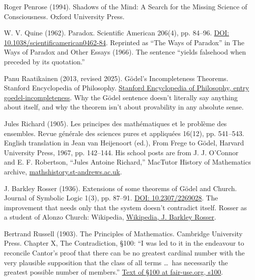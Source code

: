 \documentclass[11pt,twoside]{article}
\theoremstyle{thielethm}
\theoremstyle{thieledef}
\theoremstyle{thieledef}
\theoremstyle{thieledef}
\theoremstyle{thielethm}
\theoremstyle{thieleobs}
\theoremstyle{thielethm}
\begin{document}
\noindent Roger Penrose (1994). Shadows of the Mind: A Search for the Missing Science of Consciousness. Oxford University Press.
\par\medskip

\noindent W. V. Quine (1962). Paradox. Scientific American 206(4), pp. 84--96. \href{https://doi.org/10.1038/scientificamerican0462-84}{DOI: 10.1038/scientificamerican0462-84}. Reprinted as ``The Ways of Paradox'' in The Ways of Paradox and Other Essays (1966). The sentence ``yields falsehood when preceded by its quotation.''
\par\medskip

\noindent Panu Raatikainen (2013, revised 2025). G\"odel's Incompleteness Theorems. Stanford Encyclopedia of Philosophy. \href{https://plato.stanford.edu/entries/goedel-incompleteness/}{Stanford Encyclopedia of Philosophy, entry goedel-incompleteness}. Why the G\"odel sentence doesn't literally say anything about itself, and why the theorem isn't about provability in any absolute sense.
\par\medskip

\noindent Jules Richard (1905). Les principes des math\'ematiques et le probl\`eme des ensembles. Revue g\'en\'erale des sciences pures et appliqu\'ees 16(12), pp. 541--543. English translation in Jean van Heijenoort (ed.), From Frege to G\"odel, Harvard University Press, 1967, pp. 142--144. His school posts are from J. J. O'Connor and E. F. Robertson, ``Jules Antoine Richard,'' MacTutor History of Mathematics archive, \href{https://mathshistory.st-andrews.ac.uk/Biographies/Richard_Jules/}{mathshistory.st-andrews.ac.uk}.
\par\medskip

\noindent J. Barkley Rosser (1936). Extensions of some theorems of G\"odel and Church. Journal of Symbolic Logic 1(3), pp. 87--91. \href{https://doi.org/10.2307/2269028}{DOI: 10.2307/2269028}. The improvement that needs only that the system doesn't contradict itself. Rosser as a student of Alonzo Church: Wikipedia, \href{https://en.wikipedia.org/wiki/J._Barkley_Rosser}{Wikipedia, J. Barkley Rosser}.
\par\medskip

\noindent Bertrand Russell (1903). The Principles of Mathematics. Cambridge University Press. Chapter X, The Contradiction, \S100: ``I was led to it in the endeavour to reconcile Cantor's proof that there can be no greatest cardinal number with the very plausible supposition that the class of all terms \ldots\ has necessarily the greatest possible number of members.'' \href{https://fair-use.org/bertrand-russell/the-principles-of-mathematics/s100}{Text of \S100 at fair-use.org, s100}.
\par\medskip
\end{document}
